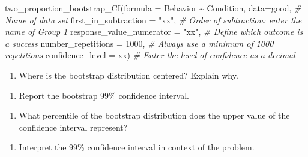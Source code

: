 \documentclass[
]{report}
\newenvironment{Shaded}{\begin{snugshade}}{\end{snugshade}}
\newcommand{\AttributeTok}[1]{\textcolor[rgb]{0.77,0.63,0.00}{#1}}
\newcommand{\CommentTok}[1]{\textcolor[rgb]{0.56,0.35,0.01}{\textit{#1}}}
\newcommand{\DecValTok}[1]{\textcolor[rgb]{0.00,0.00,0.81}{#1}}
\newcommand{\FunctionTok}[1]{\textcolor[rgb]{0.00,0.00,0.00}{#1}}
\newcommand{\NormalTok}[1]{#1}
\newcommand{\SpecialCharTok}[1]{\textcolor[rgb]{0.00,0.00,0.00}{#1}}
\newcommand{\StringTok}[1]{\textcolor[rgb]{0.31,0.60,0.02}{#1}}
\providecommand{\tightlist}{%
  \setlength{\itemsep}{0pt}\setlength{\parskip}{0pt}}
\begin{document}
\begin{Shaded}
\begin{Highlighting}[]
\FunctionTok{two\_proportion\_bootstrap\_CI}\NormalTok{(}\AttributeTok{formula =}\NormalTok{ Behavior }\SpecialCharTok{\textasciitilde{}}\NormalTok{ Condition, }
        \AttributeTok{data=}\NormalTok{good, }\CommentTok{\# Name of data set}
        \AttributeTok{first\_in\_subtraction =} \StringTok{"xx"}\NormalTok{, }\CommentTok{\# Order of subtraction: enter the name of Group 1}
        \AttributeTok{response\_value\_numerator =} \StringTok{"xx"}\NormalTok{, }\CommentTok{\# Define which outcome is a success }
        \AttributeTok{number\_repetitions =} \DecValTok{1000}\NormalTok{, }\CommentTok{\# Always use a minimum of 1000 repetitions}
        \AttributeTok{confidence\_level =}\NormalTok{ xx) }\CommentTok{\# Enter the level of confidence as a decimal}
\end{Highlighting}
\end{Shaded}

\newpage

\begin{enumerate}
\def\labelenumi{\arabic{enumi}.}
\setcounter{enumi}{7}
\tightlist
\item
  Where is the bootstrap distribution centered? Explain why.
\end{enumerate}

\vspace{0.8in}

\begin{enumerate}
\def\labelenumi{\arabic{enumi}.}
\setcounter{enumi}{8}
\tightlist
\item
  Report the bootstrap 99\% confidence interval.
\end{enumerate}

\vspace{0.4in}

\begin{enumerate}
\def\labelenumi{\arabic{enumi}.}
\setcounter{enumi}{9}
\tightlist
\item
  What percentile of the bootstrap distribution does the upper value of the confidence interval represent?
\end{enumerate}

\vspace{0.3in}

\begin{enumerate}
\def\labelenumi{\arabic{enumi}.}
\setcounter{enumi}{10}
\tightlist
\item
  Interpret the 99\% confidence interval in context of the problem.
\end{enumerate}
\end{document}
